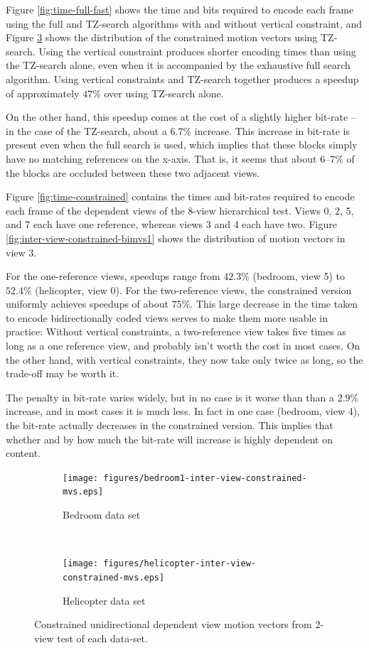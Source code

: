\documentclass{sig-alternate-05-2015}
\begin{document}
Figure \ref{fig:time-full-fast} shows the time and bits required to encode each
frame using the full and TZ-search algorithms with and without vertical
constraint, and Figure \ref{fig:inter-view-constrained-mvs} shows the
distribution of the constrained motion vectors using TZ-search. Using the
vertical constraint produces shorter encoding times than using the TZ-search
alone, even when it is accompanied by the exhaustive full search algorithm.
Using vertical constraints and TZ-search together produces a speedup of
approximately $47\%$ over using TZ-search alone.

On the other hand, this speedup comes at the cost of a slightly higher bit-rate
-- in the case of the TZ-search, about a $6.7\%$ increase. This increase in
bit-rate is present even when the full search is used, which implies that these
blocks simply have no matching references on the x-axis. That is, it seems that
about $6$--$7\%$ of the blocks are occluded between these two adjacent views.

Figure \ref{fig:time-constrained} contains the times and bit-rates required
to encode each frame of the dependent views of the 8-view hierarchical test.
Views 0, 2, 5, and 7 each have one reference, whereas views 3 and 4 each have
two. Figure \ref{fig:inter-view-constrained-bimvs1} shows the distribution of
motion vectors in view 3.

For the one-reference views, speedups range from $42.3\%$ (bedroom, view 5) to
$52.4\%$ (helicopter, view 0). For the two-reference views, the
constrained version uniformly achieves speedups of about $75\%$. This large
decrease in the time taken to encode bidirectionally coded views serves to
make them more usable in practice: Without vertical constraints, a
two-reference view takes five times as long as a one reference view, and
probably isn't worth the cost in most cases. On the other hand, with vertical
constraints, they now take only twice as long, so the trade-off may be worth it.

The penalty in bit-rate varies widely, but in no case is it worse than than a
$2.9\%$ increase, and in most cases it is much less. In fact in one case
(bedroom, view 4), the bit-rate actually decreases in the constrained version.
This implies that whether and by how much the bit-rate will increase is highly
dependent on content.

\begin{figure}[H]
\centering
\begin{subfigure}{.5\textwidth}
\centering
\texttt{[image: figures/bedroom1-inter-view-constrained-mvs.eps]}
\caption{Bedroom data set}
\label{fig:bedroom-inter-view-constrained-mvs}
\end{subfigure} \\
\begin{subfigure}{.5\textwidth}
\centering
\texttt{[image: figures/helicopter-inter-view-constrained-mvs.eps]}
\caption{Helicopter data set}
\label{fig:helicopter-inter-view-constrained-mvs}
\end{subfigure}
\caption{Constrained unidirectional dependent view motion vectors from 2-view
test of each data-set.}
\label{fig:inter-view-constrained-mvs}
\end{figure}
\end{document}
